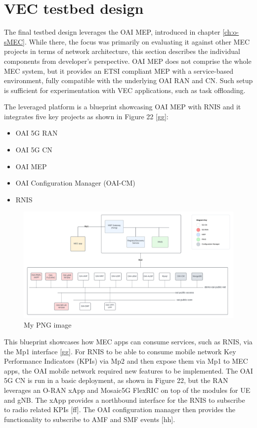 \documentclass[12pt,a4paper,twoside]{report}
\begin{document}
\section{VEC testbed design}
The final testbed design leverages the OAI MEP, introduced in chapter \ref{ch:o-sMEC}. While there, the focus was primarily on evaluating it against other MEC projects in terms of network architecture, this section describes the individual components from developer’s perspective. OAI MEP does not comprise the whole MEC system, but it provides an ETSI compliant MEP with a service-based environment, fully compatible with the underlying OAI RAN and CN. Such setup is sufficient for experimentation with VEC applications, such as task offloading. 

The leveraged platform is a blueprint showcasing OAI MEP with RNIS and it integrates five key projects as shown in Figure 22 [gg]:
\begin{itemize}
	\item OAI 5G RAN
	\item OAI 5G CN
	\item OAI MEP
	\item OAI Configuration Manager (OAI-CM)
	\item RNIS
\end{itemize}
\begin{figure}[ht]
	\centering
	\includegraphics[width=13cm]{./images/OAI-MEP-parts.png} 
	\caption{My PNG image}
\end{figure}
This blueprint showcases how MEC apps can consume services, such as RNIS, via the Mp1 interface [gg]. For RNIS to be able to consume mobile network Key Performance Indicators (KPIs) via Mp2 and then expose them via Mp1 to MEC apps, the OAI mobile network required new features to be implemented. The OAI 5G CN is run in a basic deployment, as shown in Figure 22, but the RAN leverages an O-RAN xApp and Mosaic5G FlexRIC on top of the modules for UE and gNB. The xApp provides a northbound interface for the RNIS to subscribe to radio related KPIs [ff]. The OAI configuration manager then provides the functionality to subscribe to AMF and SMF events [hh]. 
\end{document}
